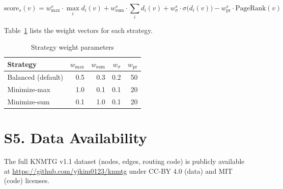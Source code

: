 \documentclass[12pt]{article}
\begin{document}
\begin{equation}
\text{score}_s(v) = w^s_{\max} \cdot \max_i d_i(v)
                  + w^s_{\text{sum}} \cdot \sum_i d_i(v)
                  + w^s_{\sigma} \cdot \sigma\bigl(d_i(v)\bigr)
                  - w^s_{\text{pr}} \cdot \text{PageRank}(v)
\end{equation}

Table~\ref{tab:weights} lists the weight vectors for each strategy.

\begin{table}[h]
\centering
\caption{Strategy weight parameters}
\label{tab:weights}
\begin{tabular}{lrrrr}
\toprule
Strategy & $w_{\max}$ & $w_{\text{sum}}$ & $w_{\sigma}$ & $w_{\text{pr}}$ \\
\midrule
Balanced (default) & 0.5 & 0.3 & 0.2 & 50 \\
Minimize-max       & 1.0 & 0.1 & 0.1 & 20 \\
Minimize-sum       & 0.1 & 1.0 & 0.1 & 20 \\
\bottomrule
\end{tabular}
\end{table}

\section*{S5. Data Availability}

The full KNMTG v1.1 dataset (nodes, edges, routing code) is publicly
available at \url{https://github.com/yjkim0123/knmtg} under CC-BY 4.0
(data) and MIT (code) licenses.
\end{document}
